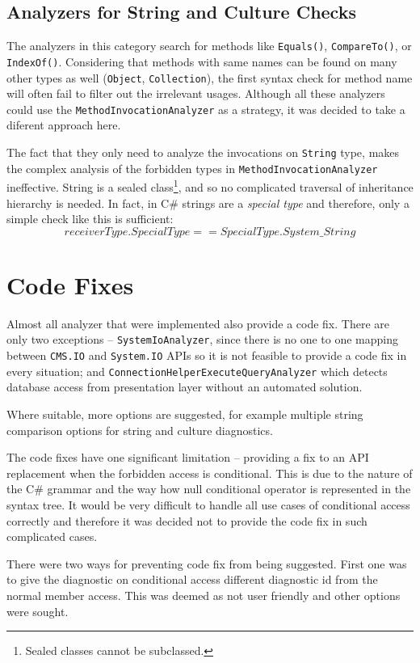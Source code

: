 \documentclass[
  digital, %
  table,   %
  lof,     %
  lot,     %
  oneside,
]{fithesis3}
\begin{document}
\subsection{Analyzers for String and Culture Checks}
The analyzers in this category search for methods like \texttt{Equals()}, \texttt{CompareTo()}, or \texttt{IndexOf()}. Considering that methods with same names can be found on many other types as well (\texttt{Object}, \texttt{Collection}), the first syntax check for method name will often fail to filter out the irrelevant usages. Although all these analyzers could use the \texttt{MethodInvocationAnalyzer} as a strategy, it was decided to take a diferent approach here. 

The fact that they only need to analyze the invocations on \texttt{String} type, makes the complex analysis of the forbidden types in \texttt{MethodInvocationAnalyzer} ineffective. String is a sealed class\footnote{Sealed classes cannot be subclassed.}, and so no complicated traversal of inheritance hierarchy is needed. In fact, in C\# strings are a \textit{special type} and therefore, only a simple check like this is sufficient:
$$
receiverType.SpecialType == SpecialType.System\_String
$$

\section{Code Fixes}
Almost all analyzer that were implemented also provide a code fix. There are only two exceptions -- \texttt{SystemIoAnalyzer}, since there is no one to one mapping between \texttt{CMS.IO} and \texttt{System.IO} APIs so it is not feasible to provide a code fix in every situation; and \texttt{ConnectionHelperExecuteQueryAnalyzer} which detects database access from presentation layer without an automated solution.

Where suitable, more options are suggested, for example multiple string comparison options for string and culture diagnostics. 

The code fixes have one significant limitation -- providing a fix to an API replacement when the forbidden access is conditional. This is due to the nature of the C\# grammar and the way how null conditional operator is represented in the syntax tree. It would be very difficult to handle all use cases of conditional access correctly and therefore it was decided not to provide the code fix in such complicated cases. 

There were two ways for preventing code fix from being suggested. First one was to give the diagnostic on conditional access different diagnostic id from the normal member access. This was deemed as not user friendly and other options were sought.
\end{document}
